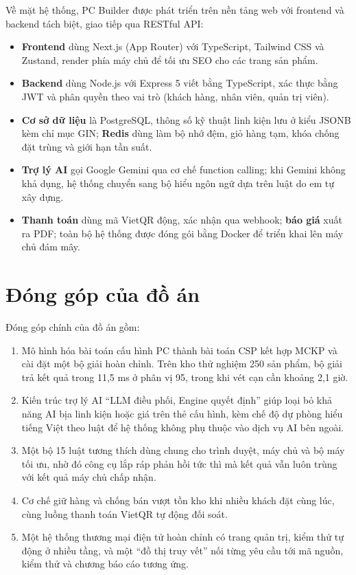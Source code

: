 Về mặt hệ thống, PC Builder được phát triển trên nền tảng web với frontend và backend tách biệt, giao tiếp qua RESTful API:
\begin{itemize}
  \item \textbf{Frontend} dùng Next.js (App Router) với TypeScript, Tailwind CSS và Zustand, render phía máy chủ để tối ưu SEO cho các trang sản phẩm.
  \item \textbf{Backend} dùng Node.js với Express 5 viết bằng TypeScript, xác thực bằng JWT và phân quyền theo vai trò (khách hàng, nhân viên, quản trị viên).
  \item \textbf{Cơ sở dữ liệu} là PostgreSQL, thông số kỹ thuật linh kiện lưu ở kiểu JSONB kèm chỉ mục GIN; \textbf{Redis} dùng làm bộ nhớ đệm, giỏ hàng tạm, khóa chống đặt trùng và giới hạn tần suất.
  \item \textbf{Trợ lý AI} gọi Google Gemini qua cơ chế function calling; khi Gemini không khả dụng, hệ thống chuyển sang bộ hiểu ngôn ngữ dựa trên luật do em tự xây dựng.
  \item \textbf{Thanh toán} dùng mã VietQR động, xác nhận qua webhook; \textbf{báo giá} xuất ra PDF; toàn bộ hệ thống được đóng gói bằng Docker để triển khai lên máy chủ đám mây.
\end{itemize}

\section{Đóng góp của đồ án}

Đóng góp chính của đồ án gồm:
\begin{enumerate}[label=(\roman*)]
  \item Mô hình hóa bài toán cấu hình PC thành bài toán CSP kết hợp MCKP và cài đặt một bộ giải hoàn chỉnh. Trên kho thử nghiệm 250 sản phẩm, bộ giải trả kết quả trong 11,5 ms ở phân vị 95, trong khi vét cạn cần khoảng 2,1 giờ.
  \item Kiến trúc trợ lý AI ``LLM điều phối, Engine quyết định'' giúp loại bỏ khả năng AI bịa linh kiện hoặc giá trên thẻ cấu hình, kèm chế độ dự phòng hiểu tiếng Việt theo luật để hệ thống không phụ thuộc vào dịch vụ AI bên ngoài.
  \item Một bộ 15 luật tương thích dùng chung cho trình duyệt, máy chủ và bộ máy tối ưu, nhờ đó công cụ lắp ráp phản hồi tức thì mà kết quả vẫn luôn trùng với kết quả máy chủ chấp nhận.
  \item Cơ chế giữ hàng và chống bán vượt tồn kho khi nhiều khách đặt cùng lúc, cùng luồng thanh toán VietQR tự động đối soát.
  \item Một hệ thống thương mại điện tử hoàn chỉnh có trang quản trị, kiểm thử tự động ở nhiều tầng, và một ``đồ thị truy vết'' nối từng yêu cầu tới mã nguồn, kiểm thử và chương báo cáo tương ứng.
\end{enumerate}


